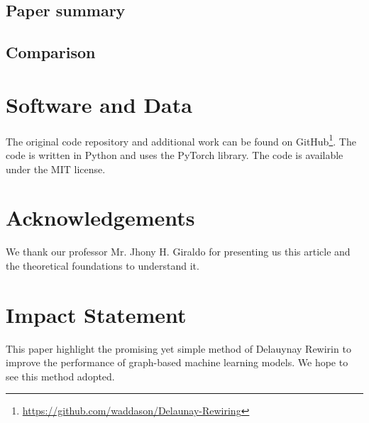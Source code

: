 \documentclass{article}
\theoremstyle{plain}
\theoremstyle{definition}
\theoremstyle{remark}
\begin{document}
\subsection{Paper summary}

\subsection{Comparison}







\section*{Software and Data}

The original code repository and additional work can be found on GitHub\footnote{ 
\url{https://github.com/waddason/Delaunay-Rewiring}}.
The code is written in Python and uses the PyTorch library. The code is available under the MIT license.

\section*{Acknowledgements}

We thank our professor Mr. Jhony H. Giraldo for presenting us this article and 
the theoretical foundations to understand it.

\section*{Impact Statement}

This paper highlight the promising yet simple method of Delauynay Rewirin to 
improve the performance of graph-based machine learning models.
We hope to see this method adopted.





\end{document}
